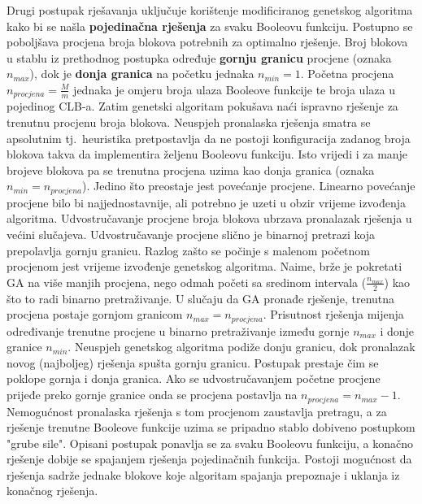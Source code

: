 \documentclass[times, utf8, diplomski]{fer}
\begin{document}
Drugi postupak rješavanja uključuje korištenje modificiranog genetskog algoritma kako bi se našla \textbf{pojedinačna rješenja} za svaku Booleovu funkciju. Postupno se poboljšava procjena broja blokova potrebnih za optimalno rješenje. Broj blokova u stablu iz prethodnog postupka određuje \textbf{gornju granicu} procjene (oznaka $n_{max}$), dok je \textbf{donja granica} na početku jednaka $n_{min}=1$. Početna procjena $n_{procjena}=\frac{M}{m}$ jednaka je omjeru broja ulaza Booleove funkcije te broja ulaza u pojedinog CLB-a. Zatim genetski algoritam pokušava naći ispravno rješenje za trenutnu procjenu broja blokova. Neuspjeh pronalaska rješenja smatra se apsolutnim tj.~heuristika pretpostavlja da ne postoji konfiguracija zadanog broja blokova takva da implementira željenu Booleovu funkciju. Isto vrijedi i za manje brojeve blokova pa se trenutna procjena uzima kao donja granica (oznaka $n_{min}=n_{procjena}$). Jedino što preostaje jest povećanje procjene. Linearno povećanje procjene bilo bi najjednostavnije, ali potrebno je uzeti u obzir vrijeme izvođenja algoritma. Udvostručavanje procjene broja blokova ubrzava pronalazak rješenja u većini slučajeva. Udvostručavanje procjene slično je binarnoj pretrazi koja prepolavlja gornju granicu. Razlog zašto se počinje s malenom početnom procjenom jest vrijeme izvođenje genetskog algoritma. Naime, brže je pokretati GA na više manjih procjena, nego odmah početi sa sredinom intervala ($\frac{n_{max}}{2}$) kao što to radi binarno pretraživanje. U slučaju da GA pronađe rješenje, trenutna procjena postaje gornjom granicom $n_{max}=n_{procjena}$. Prisutnost rješenja mijenja određivanje trenutne procjene u binarno pretraživanje između gornje $n_{max}$ i donje granice $n_{min}$. Neuspjeh genetskog algoritma podiže donju granicu, dok pronalazak novog (najboljeg) rješenja spušta gornju granicu. Postupak prestaje čim se poklope gornja i donja granica. Ako se udvostručavanjem početne procjene prijeđe preko gornje granice onda se procjena postavlja na $n_{procjena}=n_{max}-1$. Nemogućnost pronalaska rješenja s tom procjenom zaustavlja pretragu, a za rješenje trenutne Booleove funkcije uzima se pripadno stablo dobiveno postupkom "grube sile". Opisani postupak ponavlja se za svaku Booleovu funkciju, a konačno rješenje dobije se spajanjem rješenja pojedinačnih funkcija. Postoji mogućnost da rješenja sadrže jednake blokove koje algoritam spajanja prepoznaje i uklanja iz konačnog rješenja.
\end{document}
